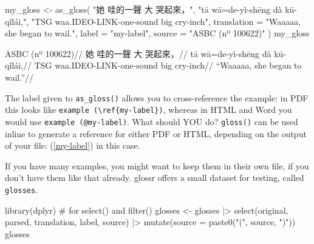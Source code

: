 \documentclass[
  letterpaper,
  DIV=11,
  numbers=noendperiod]{scrartcl}
\newenvironment{Shaded}{\begin{snugshade}}{\end{snugshade}}
\newcommand{\AttributeTok}[1]{\textcolor[rgb]{0.40,0.45,0.13}{#1}}
\newcommand{\CommentTok}[1]{\textcolor[rgb]{0.37,0.37,0.37}{#1}}
\newcommand{\FunctionTok}[1]{\textcolor[rgb]{0.28,0.35,0.67}{#1}}
\newcommand{\NormalTok}[1]{\textcolor[rgb]{0.00,0.23,0.31}{#1}}
\newcommand{\OtherTok}[1]{\textcolor[rgb]{0.00,0.23,0.31}{#1}}
\newcommand{\SpecialCharTok}[1]{\textcolor[rgb]{0.37,0.37,0.37}{#1}}
\newcommand{\StringTok}[1]{\textcolor[rgb]{0.13,0.47,0.30}{#1}}
\begin{document}
\begin{Shaded}
\begin{Highlighting}[]
\NormalTok{my\_gloss }\OtherTok{\textless{}{-}} \FunctionTok{as\_gloss}\NormalTok{(}
  \StringTok{"她 哇的一聲 大 哭起來，"}\NormalTok{,}
  \StringTok{"tā wā=de{-}yì{-}shēng dà kū{-}qǐlái,"}\NormalTok{,}
  \StringTok{"TSG waa.IDEO{-}LINK{-}one{-}sound big cry{-}inch"}\NormalTok{,}
  \AttributeTok{translation =} \StringTok{"Waaaaa, she began to wail."}\NormalTok{,}
  \AttributeTok{label =} \StringTok{"my{-}label"}\NormalTok{,}
  \AttributeTok{source =} \StringTok{"ASBC (nº 100622)"}
\NormalTok{)}
\NormalTok{my\_gloss}
\end{Highlighting}
\end{Shaded}

\ex\label{my-label}
\begingl \glpreamble ASBC (nº 100622)// \gla 她 哇的一聲 大 哭起來，//
\glb tā wā=de-yì-shēng dà kū-qǐlái,// \glc TSG waa.IDEO-LINK-one-sound
big cry-inch// \glft ``Waaaaa, she began to wail.''// \endgl \xe 

The label given to \texttt{as\_gloss()} allows you to cross-reference
the example: in PDF this looks like
\texttt{example\ (\textbackslash{}ref\{my-label\})}, whereas in HTML and
Word you would use \texttt{example\ (@my-label)}. What should YOU do?
\texttt{gloss()} can be used inline to generate a reference for either
PDF or HTML, depending on the output of your file: (\ref{my-label}) in
this case.

If you have many examples, you might want to keep them in their own
file, if you don't have them like that already. glossr offers a small
dataset for testing, called \texttt{glosses}.

\begin{Shaded}
\begin{Highlighting}[]
\FunctionTok{library}\NormalTok{(dplyr) }\CommentTok{\# for select() and filter()}
\NormalTok{glosses }\OtherTok{\textless{}{-}}\NormalTok{ glosses }\SpecialCharTok{|\textgreater{}} 
  \FunctionTok{select}\NormalTok{(original, parsed, translation, label, source) }\SpecialCharTok{|\textgreater{}} 
  \FunctionTok{mutate}\NormalTok{(}\AttributeTok{source =} \FunctionTok{paste0}\NormalTok{(}\StringTok{"("}\NormalTok{, source, }\StringTok{")"}\NormalTok{))}
\NormalTok{glosses}
\end{Highlighting}
\end{Shaded}
\end{document}
